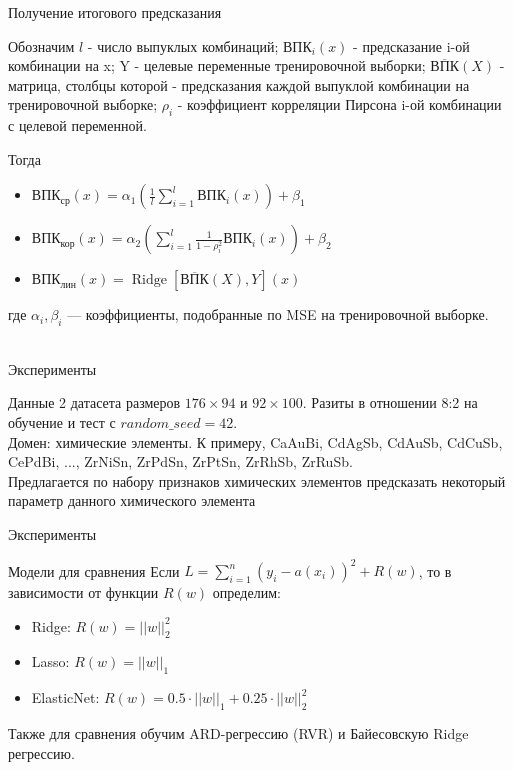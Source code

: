 \documentclass{beamer}
\begin{document}
\begin{frame}{Получение итогового предсказания}
\begin{block}{Обозначим}
     $l$ - число выпуклых комбинаций; $\text{ВПК}_i(x)$ - предсказание i-ой комбинации на x; Y - целевые переменные тренировочной выборки; $\overline{\text{ВПК}}(X)$ - матрица, столбцы которой - предсказания каждой выпуклой комбинации на тренировочной выборке; $\rho_i$ - коэффициент корреляции Пирсона i-ой комбинации с целевой переменной.
\end{block}
\begin{block}{Тогда}
\begin{itemize}
    \item $\text{ВПК}_{\text{ср}}(x) = \alpha_1 (\frac{1}{l} \sum_{i=1}^l \text{ВПК}_i(x)) + \beta_1$
    \item $\text{ВПК}_{\text{кор}}(x) = \alpha_2 ( \sum_{i=1}^l \frac{1}{1 - \rho^2_i} \text{ВПК}_i(x)) + \beta_2$
    \item $\text{ВПК}_{\text{лин}}(x) = \operatorname{Ridge}[\overline{\text{ВПК}}(X), Y](x)$
\end{itemize}
где $\alpha_i, \beta_i$ — коэффициенты, подобранные по MSE на тренировочной выборке.
\\ \\
\end{block}
\end{frame}
\begin{frame}{Эксперименты}
\begin{block}{Данные}
2 датасета размеров $176 \times 94$ и $92 \times 100$. Разиты в отношении 8:2 на обучение и тест с $random\_seed=42$.\\
Домен: химические элементы. К примеру, CaAuBi, CdAgSb, CdAuSb, CdCuSb, CePdBi, ..., ZrNiSn, ZrPdSn, ZrPtSn, ZrRhSb, ZrRuSb. \\
Предлагается по набору признаков химических элементов предсказать некоторый параметр данного химического элемента
\end{block}
\end{frame}
\begin{frame}{Эксперименты}
\begin{block}{Модели для сравнения}
Если $L = \sum_{i=1}^n (y_i - a(x_i))^2 + R(w)$, то в зависимости от функции $R(w)$ определим:
\begin{itemize}
    \item Ridge: $R(w) = ||w||_2^2$
    \item Lasso: $R(w) = ||w||_1$
    \item ElasticNet: $R(w) = 0.5 \cdot ||w||_1 + 0.25 \cdot ||w||_2^2$
\end{itemize}
Также для сравнения обучим ARD-регрессию (RVR) и Байесовскую Ridge регрессию. 
\end{block}
\end{frame}
\end{document}
